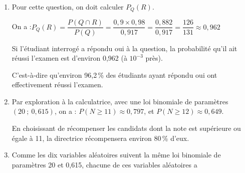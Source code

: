 \begin{enumerate}
\begin{enumerate}
		\item On sait que $P(Q)=0,917$, or, comme $R$ et $\overline{R}$ partitionnent l'univers, en vertu de la loi des probabilités totales, on a également :

		$\begin{aligned} P(Q) &= P\big(Q \cap R\big) + P\left(Q \cap \overline{R}\right)\\
		&= x\times 0,98 + (1 -x) \times 0,35\\
		&= 0,98x + 0,35 - 0,35x\\
		&= 0,63x + 0,35		\end{aligned}$

		Puisque la probabilité de $Q$ est unique, on peut donc écrire, puis résoudre l'équation :
		\quad
		$\begin{aligned}[t] 0,63x + 0,35 = 0,917 &\iff 0,63x = 0,567\\
		&\iff x = \dfrac{0,567}{0,63}\\
		&\iff x = 0,9\end{aligned}$

La solution de l'équation est donc 0,9 : la probabilité que l'étudiant ait réussi son examen est donc de 0,9 (ou bien : 90\,\% des étudiants ont réussi leur examen).
	\end{enumerate}

	\item Pour cette question, on doit calculer $P_Q(R)$.

	On a :\quad $P_Q(R) = \dfrac{P(Q \cap R)}{P(Q)} = \dfrac{0,9 \times 0,98}{0,917}=\dfrac{0,882}{0,917}=\dfrac{126}{131}\approx0,962$

Si l'étudiant interrogé a répondu \og oui\fg{}  à la question, la probabilité qu'il ait réussi l'examen est d'environ 0,962 (à $10^{-3}$ près).

C'est-à-dire qu'environ 96,2\,\% des étudiants ayant répondu \og oui\fg{} ont effectivement réussi l'examen.

	\item Par exploration à la calculatrice, avec une loi binomiale de paramètres $(20~;~0,615)$, on a :\quad
	$P(N\geqslant 11)\approx 0,797$, \quad et \quad $P(N \geqslant 12) \approx 0,649$.

En choisissant de récompenser les candidats dont la note est supérieure ou égale à 11, la directrice récompensera environ 80\,\% d'eux.

	\item Comme les dix variables aléatoires suivent la même loi binomiale de paramètres 20 et 0,615, chacune de ces variables aléatoires a


\end{enumerate}
